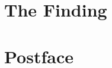 \documentclass[openany]{book} %
\begin{document}
\clearpage

\clearpage
\chapter{The Finding}


\clearpage

\clearpage
\chapter*{Postface}


\clearpage

\clearpage
{}
\thispagestyle{empty}

\end{document}
